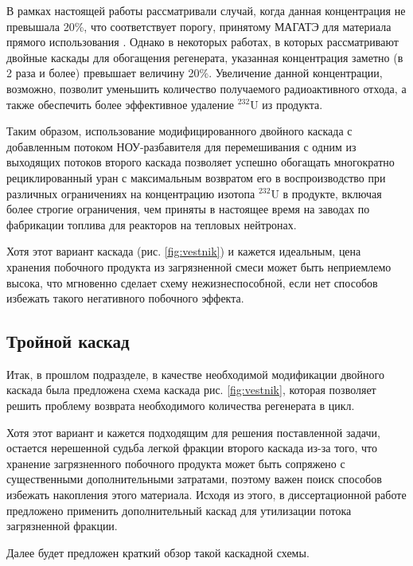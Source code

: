В рамках настоящей работы рассматривали случай, когда данная концентрация не превышала 20\%, что соответствует порогу, принятому МАГАТЭ для материала прямого использования \cite{alekseevConceptUseRecycled2010}. Однако в некоторых работах, в которых рассматривают двойные каскады для обогащения регенерата, указанная концентрация заметно (в 2 раза и более) превышает величину 20\%. Увеличение данной концентрации, возможно, позволит уменьшить количество получаемого радиоактивного отхода, а также обеспечить более эффективное удаление $^{232}$U из продукта.

Таким образом, использование модифицированного двойного каскада с добавленным потоком НОУ-разбавителя для перемешивания с одним из выходящих потоков второго каскада позволяет успешно обогащать многократно рециклированный уран с максимальным возвратом его в воспроизводство при различных ограничениях на концентрацию изотопа $^{232}$U в продукте, включая более строгие ограничения, чем приняты в настоящее время на заводах по фабрикации топлива для реакторов на тепловых нейтронах.

Хотя этот вариант каскада (рис. \ref{fig:vestnik}) и кажется идеальным, цена хранения побочного продукта из загрязненной смеси может быть неприемлемо высока, что мгновенно сделает схему нежизнеспособной, если нет способов избежать такого негативного побочного эффекта.

\subsection{Тройной каскад}
Итак, в прошлом подразделе, в качестве необходимой модификации двойного каскада была предложена схема каскада рис. \ref{fig:vestnik}, которая позволяет решить проблему возврата необходимого количества регенерата в цикл.

Хотя этот вариант и кажется подходящим для решения поставленной задачи, остается нерешенной судьба легкой фракции второго каскада из-за того, что хранение загрязненного побочного продукта может быть сопряжено с существенными дополнительными затратами, поэтому важен поиск способов избежать накопления этого материала.
Исходя из этого, в диссертационной работе предложено применить дополнительный каскад для утилизации потока загрязненной фракции.

Далее будет предложен краткий обзор такой каскадной схемы.
 
